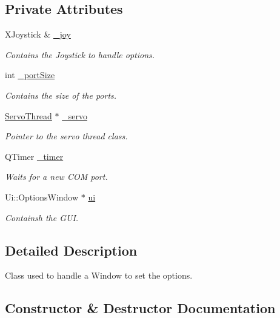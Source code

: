 \subsection*{Private Attributes}
\begin{DoxyCompactItemize}
\item 
X\+Joystick \& \hyperlink{class_options_window_a1bf846ab681ab245f70adac30999947c}{\+\_\+joy}
\begin{DoxyCompactList}\small\item\em Contains the Joystick to handle options. \end{DoxyCompactList}\item 
int \hyperlink{class_options_window_a9bd4dccc7a544b1db78dc8cf330b88f6}{\+\_\+port\+Size}
\begin{DoxyCompactList}\small\item\em Contains the size of the ports. \end{DoxyCompactList}\item 
\hyperlink{class_servo_thread}{Servo\+Thread} $\ast$ \hyperlink{class_options_window_acba1566fea3f831000d5e1c1edc3e776}{\+\_\+servo}
\begin{DoxyCompactList}\small\item\em Pointer to the servo thread class. \end{DoxyCompactList}\item 
Q\+Timer \hyperlink{class_options_window_af6320942b8558140989f552b3bbc1fbd}{\+\_\+timer}
\begin{DoxyCompactList}\small\item\em Waits for a new C\+O\+M port. \end{DoxyCompactList}\item 
Ui\+::\+Options\+Window $\ast$ \hyperlink{class_options_window_a8347442d5b3b670e8fff0c4102db1f88}{ui}
\begin{DoxyCompactList}\small\item\em Containsh the G\+U\+I. \end{DoxyCompactList}\end{DoxyCompactItemize}


\subsection{Detailed Description}
Class used to handle a Window to set the options. 

\subsection{Constructor \& Destructor Documentation}
\hypertarget{class_options_window_ae8e0a610d13a0478bdac57ec7cd4afba}{}
